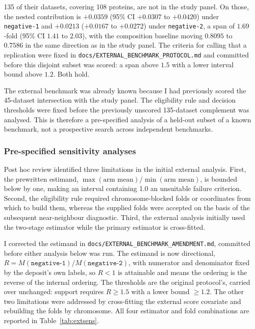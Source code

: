 135 of their datasets, covering 108 proteins, are not in the study panel. On those, the nested
contribution is $+0.0359$ (95\% CI $+0.0307$ to $+0.0420$) under \texttt{negative-1} and
$+0.0213$ ($+0.0167$ to $+0.0272$) under \texttt{negative-2}, a span of $\mathbf{1.69}$-fold
(95\% CI $1.41$ to $2.03$), with the composition baseline moving $0.8095$ to $0.7586$ in the
same direction as in the study panel. The criteria for calling that a replication were fixed in
\texttt{docs/EXTERNAL\_BENCHMARK\_PROTOCOL.md} and committed before this disjoint subset was
scored: a span above $1.5$ with a lower interval bound above $1.2$. Both hold.

The external benchmark was already known because I had previously scored the 45-dataset
intersection with the study panel. The eligibility rule and decision thresholds were fixed before the
previously unscored 135-dataset complement was analysed. This is therefore a pre-specified
analysis of a held-out subset of a known benchmark, not a prospective search across independent
benchmarks.

\subsubsection*{Pre-specified sensitivity analyses}

Post hoc review identified three limitations in the initial external analysis. First, the
prewritten estimand, $\max(\text{arm mean}) / \min(\text{arm mean})$, is bounded below by one,
making an interval containing 1.0 an unsuitable failure criterion. Second, the eligibility rule
required chromosome-blocked folds or coordinates from which to build them, whereas the supplied
folds were accepted on the basis of the subsequent near-neighbour diagnostic. Third, the
external analysis initially used the two-stage estimator while the primary estimator is
cross-fitted.

I corrected the estimand in
\texttt{docs/\allowbreak EXTERNAL\_\allowbreak BENCHMARK\_\allowbreak AMENDMENT.md}, committed before either analysis below was
run. The estimand is now directional, $R = M(\texttt{negative-1}) / M(\texttt{negative-2})$,
with numerator and denominator fixed by the deposit's own labels, so $R < 1$ is attainable and
means the ordering is the reverse of the internal ordering. The thresholds are the original protocol's, carried
over unchanged: support requires $R \geq 1.5$ with a lower bound $\geq 1.2$. The other two
limitations were addressed by cross-fitting the external score covariate and rebuilding the
folds by chromosome. All four estimator and fold combinations are reported in
Table~\ref{tab:extsens}.

